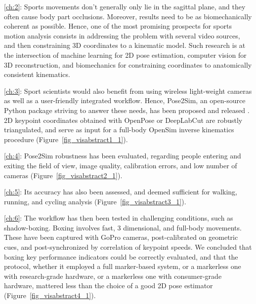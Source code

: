 \noindent\autoref{ch:2}: Sports movements don’t generally only lie in the sagittal plane, and they often cause body part occlusions. Moreover, results need to be as biomechanically coherent as possible. Hence, one of the most promising prospects for sports motion analysis consists in addressing the problem with several video sources, and then constraining 3D coordinates to a kinematic model.  Such research is at the intersection of machine learning for 2D pose estimation, computer vision for 3D reconstruction, and biomechanics for constraining coordinates to anatomically consistent kinematics. 

\noindent\autoref{ch:3}: Sport scientists would also benefit from using wireless light-weight cameras as well as a user-friendly integrated workflow. Hence, Pose2Sim, an open-source Python package striving to answer these needs, has been proposed and released \cite{Pagnon2022b}. 2D keypoint coordinates obtained with OpenPose or DeepLabCut are robustly triangulated, and serve as input for a full-body OpenSim inverse kinematics procedure (Figure~\ref{fig_visabstract1_1}).

\noindent\autoref{ch:4}: Pose2Sim robustness has been evaluated, regarding people entering and exiting the field of view, image quality, calibration errors, and low number of cameras \cite{Pagnon2021} (Figure~\ref{fig_visabstract2_1}). 

\noindent\autoref{ch:5}: Its accuracy has also been assessed, and deemed sufficient for walking, running, and cycling analysis \cite{Pagnon2022a} (Figure~\ref{fig_visabstract3_1}). 

\noindent\autoref{ch:6}: The workflow has then been tested in challenging conditions, such as shadow-boxing. Boxing involves fast, 3 dimensional, and full-body movements. These have been captured with GoPro cameras, post-calibrated on geometric cues, and post-synchronized by correlation of keypoint speeds. We concluded that boxing key performance indicators could be correctly evaluated, and that the protocol, whether it employed a full marker-based system, or a markerless one with research-grade hardware, or a markerless one with consumer-grade hardware, mattered less than the choice of a good 2D pose estimator \cite{Pagnon2022c} (Figure~\ref{fig_visabstract4_1}).  

